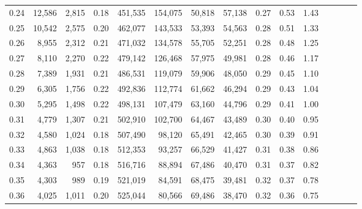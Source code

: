 \begin{tabular}{rrrcrrrrrrrrrrr}
0.24 &  12,586 &  2,815 &                                       0.18 &  451,535 &  154,075 &   50,818 &   57,138 &  0.27 &  0.53 &                         1.43 \\
0.25 &  10,542 &  2,575 &                                       0.20 &  462,077 &  143,533 &   53,393 &   54,563 &  0.28 &  0.51 &                         1.33 \\
0.26 &   8,955 &  2,312 &                                       0.21 &  471,032 &  134,578 &   55,705 &   52,251 &  0.28 &  0.48 &                         1.25 \\
0.27 &   8,110 &  2,270 &                                       0.22 &  479,142 &  126,468 &   57,975 &   49,981 &  0.28 &  0.46 &                         1.17 \\
0.28 &   7,389 &  1,931 &                                       0.21 &  486,531 &  119,079 &   59,906 &   48,050 &  0.29 &  0.45 &                         1.10 \\
0.29 &   6,305 &  1,756 &                                       0.22 &  492,836 &  112,774 &   61,662 &   46,294 &  0.29 &  0.43 &                         1.04 \\
0.30 &   5,295 &  1,498 &                                       0.22 &  498,131 &  107,479 &   63,160 &   44,796 &  0.29 &  0.41 &                         1.00 \\
0.31 &   4,779 &  1,307 &                                       0.21 &  502,910 &  102,700 &   64,467 &   43,489 &  0.30 &  0.40 &                         0.95 \\
0.32 &   4,580 &  1,024 &                                       0.18 &  507,490 &   98,120 &   65,491 &   42,465 &  0.30 &  0.39 &                         0.91 \\
0.33 &   4,863 &  1,038 &                                       0.18 &  512,353 &   93,257 &   66,529 &   41,427 &  0.31 &  0.38 &                         0.86 \\
0.34 &   4,363 &    957 &                                       0.18 &  516,716 &   88,894 &   67,486 &   40,470 &  0.31 &  0.37 &                         0.82 \\
0.35 &   4,303 &    989 &                                       0.19 &  521,019 &   84,591 &   68,475 &   39,481 &  0.32 &  0.37 &                         0.78 \\
0.36 &   4,025 &  1,011 &                                       0.20 &  525,044 &   80,566 &   69,486 &   38,470 &  0.32 &  0.36 &                         0.75 \\

\end{tabular}
